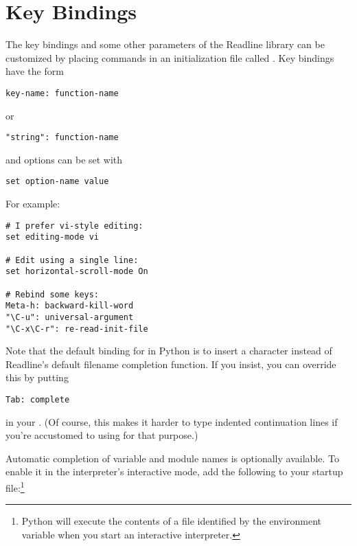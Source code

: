 \documentclass{manual}
\begin{document}
\section{Key Bindings \label{keyBindings}}

The key bindings and some other parameters of the Readline library can
be customized by placing commands in an initialization file called
.  Key bindings have the form

\begin{verbatim}
key-name: function-name
\end{verbatim}

or

\begin{verbatim}
"string": function-name
\end{verbatim}

and options can be set with

\begin{verbatim}
set option-name value
\end{verbatim}

For example:

\begin{verbatim}
# I prefer vi-style editing:
set editing-mode vi

# Edit using a single line:
set horizontal-scroll-mode On

# Rebind some keys:
Meta-h: backward-kill-word
"\C-u": universal-argument
"\C-x\C-r": re-read-init-file
\end{verbatim}

Note that the default binding for  in Python is to insert a
 character instead of Readline's default filename completion
function.  If you insist, you can override this by putting

\begin{verbatim}
Tab: complete
\end{verbatim}

in your .  (Of course, this makes it harder to
type indented continuation lines if you're accustomed to using
 for that purpose.)

Automatic completion of variable and module names is optionally
available.  To enable it in the interpreter's interactive mode, add
the following to your startup file:\footnote{
  Python will execute the contents of a file identified by the
   environment variable when you start an
  interactive interpreter.}
\end{document}
